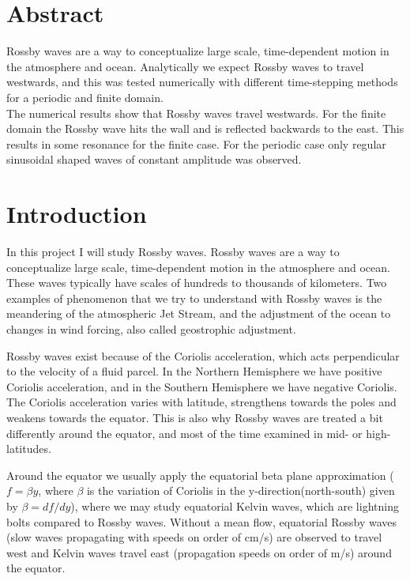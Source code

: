 

\section{Abstract}
Rossby waves are a way to conceptualize large scale, time-dependent motion in the atmosphere and ocean. Analytically we expect Rossby waves to travel westwards, and this was tested numerically with different time-stepping methods for a periodic and finite domain. \\

The numerical results show that Rossby waves travel westwards. For the finite domain the Rossby wave hits the wall and is reflected backwards to the east. This results in some resonance for the finite case. For the periodic case only regular sinusoidal shaped waves of constant amplitude was observed.




\section{Introduction}
In this project I will study Rossby waves. Rossby waves are a way to conceptualize large scale, time-dependent motion in the atmosphere and ocean. These waves typically have scales of hundreds to thousands of kilometers. Two examples of phenomenon that we try to understand with Rossby waves is the meandering of the atmospheric Jet Stream, and the adjustment of the ocean to changes in wind forcing, also called geostrophic adjustment.\cite{geofludyn}

Rossby waves exist because of the Coriolis acceleration, which acts perpendicular to the velocity of a fluid parcel. In the Northern Hemisphere we have positive Coriolis acceleration, and in the Southern Hemisphere we have negative Coriolis. The Coriolis acceleration varies with latitude, strengthens towards the poles and weakens towards the equator. This is also why Rossby waves are treated a bit differently around the equator, and most of the time examined in mid- or high- latitudes. \cite{rossby}

Around the equator we usually apply the equatorial beta plane approximation ($f=\beta y$, where $\beta$ is the variation of Coriolis in the y-direction(north-south) given by $\beta = df/dy$), where we may study equatorial Kelvin waves, which are lightning bolts compared to Rossby waves. Without a mean flow, equatorial Rossby waves (slow waves propagating with speeds on order of cm/s) are observed to travel west and Kelvin waves travel east (propagation speeds on order of m/s) around the equator.\cite{equator}\\


